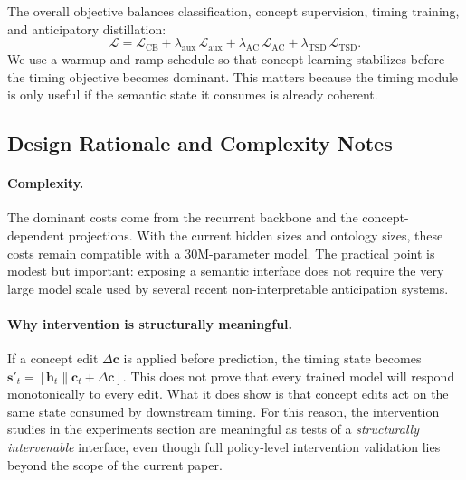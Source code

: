 The overall objective balances classification, concept supervision, timing
training, and anticipatory distillation:
\begin{equation}
  \mathcal{L}
  = \mathcal{L}_{\text{CE}}
  + \lambda_{\text{aux}}\,\mathcal{L}_{\text{aux}}
  + \lambda_{\text{AC}}\,\mathcal{L}_{\text{AC}}
  + \lambda_{\text{TSD}}\,\mathcal{L}_{\text{TSD}}.
  \label{eq:total_loss}
\end{equation}
We use a warmup-and-ramp schedule so that concept learning stabilizes before
the timing objective becomes dominant. This matters because the timing module
is only useful if the semantic state it consumes is already coherent.

\subsection{Design Rationale and Complexity Notes}
\label{sec:theory}

\paragraph{Complexity.}
The dominant costs come from the recurrent backbone and the concept-dependent
projections. With the current hidden sizes and ontology sizes, these costs
remain compatible with a 30M-parameter model. The practical point is modest but
important: exposing a semantic interface does not require the very large model
scale used by several recent non-interpretable anticipation systems.

\paragraph{Why intervention is structurally meaningful.}
If a concept edit $\Delta\mathbf{c}$ is applied before prediction, the timing
state becomes $\mathbf{s}'_t = [\mathbf{h}_t \| \mathbf{c}_t + \Delta\mathbf{c}]$.
This does not prove that every trained model will respond monotonically to
every edit. What it does show is that concept edits act on the same state
consumed by downstream timing. For this reason, the intervention studies in the
experiments section are meaningful as tests of a \emph{structurally
intervenable} interface, even though full policy-level intervention validation lies
beyond the scope of the current paper.
